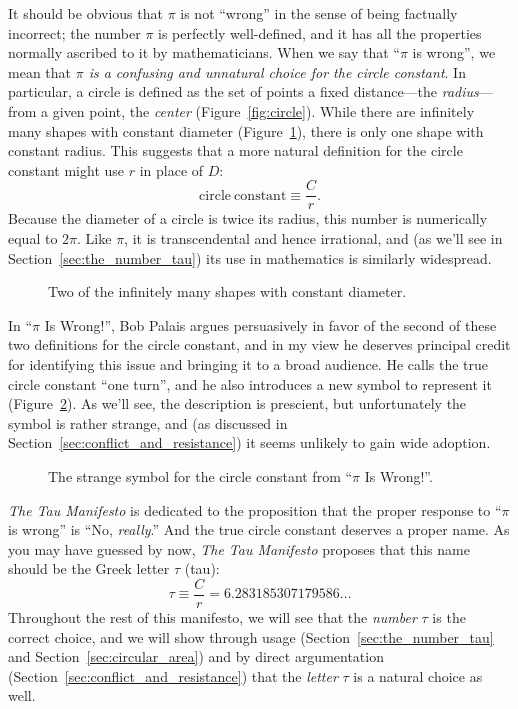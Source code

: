 It should be obvious that $\pi$ is not ``wrong'' in the sense of being factually incorrect; the number $\pi$ is perfectly well-defined, and it has all the properties normally ascribed to it by mathematicians. When we say that ``$\pi$ is wrong'', we mean that \emph{$\pi$ is a confusing and unnatural choice for the circle constant}. In particular, a circle is defined as the set of points a fixed distance---the \emph{radius}---from a given point, the \emph{center} (Figure~\ref{fig:circle}). While there are infinitely many shapes with constant diameter (Figure~\ref{fig:bicycle_constant_diameters}), there is only one shape with constant radius. This suggests that a more natural definition for the circle constant might use $r$ in place of $D$:
\[
  \mathrm{circle\ constant} \equiv \frac{C}{r}.
\]
Because the diameter of a circle is twice its radius, this number is numerically equal to $2\pi$. Like $\pi$, it is transcendental and hence irrational, and (as we'll see in Section~\ref{sec:the_number_tau}) its use in mathematics is similarly widespread.

\begin{figure}
\caption{Two of the infinitely many shapes with constant diameter.\label{fig:bicycle_constant_diameters}}
\end{figure}

In ``$\pi$ Is Wrong!'', Bob Palais argues persuasively in favor of the second of these two definitions for the circle constant, and in my view he deserves principal credit for identifying this issue and bringing it to a broad audience. He calls the true circle constant ``one turn'', and he also introduces a new symbol to represent it (Figure~\ref{fig:palais_tau}). As we'll see, the description is prescient, but unfortunately the symbol is rather strange, and (as discussed in Section~\ref{sec:conflict_and_resistance}) it seems unlikely to gain wide adoption.

\begin{figure}
\caption{The strange symbol for the circle constant from ``$\pi$ Is Wrong!''.\label{fig:palais_tau}}
\end{figure}

\emph{The Tau Manifesto} is dedicated to the proposition that the proper response to ``$\pi$ is wrong'' is ``No, \emph{really}.'' And the true circle constant deserves a proper name. As you may have guessed by now, \emph{The Tau Manifesto} proposes that this name should be the Greek letter $\tau$ (tau):
\[
  \tau \equiv \frac{C}{r} = 6.283185307179586\ldots
\]
Throughout the rest of this manifesto, we will see that the \emph{number} $\tau$ is the correct choice, and we will show through usage (Section~\ref{sec:the_number_tau} and Section~\ref{sec:circular_area}) and by direct argumentation (Section~\ref{sec:conflict_and_resistance}) that the \emph{letter} $\tau$ is a natural choice as well.

